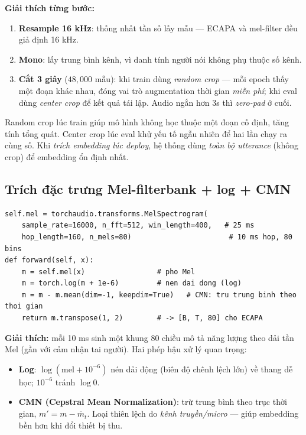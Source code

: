 \documentclass[12pt,a4paper]{article}
\begin{document}
\textbf{Giải thích từng bước:}
\begin{enumerate}
  \item \textbf{Resample 16 kHz}: thống nhất tần số lấy mẫu --- ECAPA và mel-filter
  đều giả định 16 kHz.
  \item \textbf{Mono}: lấy trung bình kênh, vì danh tính người nói không phụ thuộc
  số kênh.
  \item \textbf{Cắt 3 giây} ($48{,}000$ mẫu): khi train dùng \emph{random crop} ---
  mỗi epoch thấy một đoạn khác nhau, đóng vai trò augmentation thời gian \emph{miễn
  phí}; khi eval dùng \emph{center crop} để kết quả tái lập. Audio ngắn hơn 3s thì
  \emph{zero-pad} ở cuối.
\end{enumerate}

\begin{ycbox}
Random crop lúc train giúp mô hình không học thuộc một đoạn cố định, tăng tính
tổng quát. Center crop lúc eval khử yếu tố ngẫu nhiên để hai lần chạy ra cùng số.
Khi \emph{trích embedding lúc deploy}, hệ thống dùng \emph{toàn bộ utterance} (không
crop) để embedding ổn định nhất.
\end{ycbox}

\subsection{Trích đặc trưng Mel-filterbank + log + CMN}
\begin{lstlisting}
self.mel = torchaudio.transforms.MelSpectrogram(
    sample_rate=16000, n_fft=512, win_length=400,   # 25 ms
    hop_length=160, n_mels=80)                       # 10 ms hop, 80 bins
def forward(self, x):
    m = self.mel(x)                 # pho Mel
    m = torch.log(m + 1e-6)         # nen dai dong (log)
    m = m - m.mean(dim=-1, keepdim=True)   # CMN: tru trung binh theo thoi gian
    return m.transpose(1, 2)        # -> [B, T, 80] cho ECAPA
\end{lstlisting}

\textbf{Giải thích:} mỗi 10 ms sinh một khung 80 chiều mô tả năng lượng theo dải
tần Mel (gần với cảm nhận tai người). Hai phép hậu xử lý quan trọng:
\begin{itemize}
  \item \textbf{Log}: $\log(\text{mel}+10^{-6})$ nén dải động (biên độ chênh lệch
  lớn) về thang dễ học; $10^{-6}$ tránh $\log 0$.
  \item \textbf{CMN (Cepstral Mean Normalization)}: trừ trung bình theo trục thời
  gian, $m' = m - \overline{m}_t$. Loại thiên lệch do \emph{kênh truyền/micro} ---
  giúp embedding bền hơn khi đổi thiết bị thu.
\end{itemize}
\end{document}
